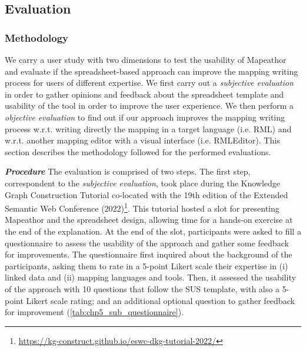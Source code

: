\subsection{Evaluation}

\subsubsection{Methodology}
\label{sec:chp5_mapeathor_eval_method}

We carry a user study with two dimensions to test the usability of Mapeathor and evaluate if the spreadsheet-based approach can improve the mapping writing process for users of different expertise. We first carry out a \textit{subjective evaluation} in order to gather opinions and feedback about the spreadsheet template and usability of the tool in order to improve the user experience. We then perform a \textit{objective evaluation} to find out if our approach improves the mapping writing process w.r.t. writing directly the mapping in a target language (i.e. RML) and w.r.t. another mapping editor with a visual interface (i.e. RMLEditor). This section describes the methodology followed for the performed evaluations.



\noindent\textit{\textbf{Procedure}} The evaluation is comprised of two steps. The first step, correspondent to the \textit{subjective evaluation}, took place during the Knowledge Graph Construction Tutorial co-located with the 19th edition of the Extended Semantic Web Conference (2022)\footnote{\url{https://kg-construct.github.io/eswc-dkg-tutorial-2022/}}. This tutorial hosted a slot for presenting Mapeathor and the spreadsheet design, allowing time for a hands-on exercise at the end of the explanation. At the end of the slot, participants were asked to fill a questionnaire to assess the usability of the approach and gather some feedback for improvements. The questionnaire first inquired about the background of the participants, asking them to rate in a 5-point Likert scale their expertise in (i) linked data and (ii) mapping languages and tools. Then, it assessed the usability of the approach with 10 questions that follow the SUS template, with also a 5-point Likert scale rating; and an additional optional question to gather feedback for improvement (\cref{tab:chp5_sub_questionnaire}).


